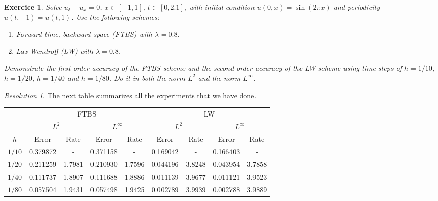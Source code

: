 \documentclass[10pt,a4paper]{article}
\newtheorem{exercici}{Exercice}
\theoremstyle{definition}
\theoremstyle{remark}
\newtheorem*{res}{Resolution}
\begin{document}
\setcounter{exercici}{14}
\begin{exercici}
  Solve $u_t+u_x=0$, $x\in[-1,1]$, $t\in[0,2.1]$, with initial condition $u(0,x)=\sin(2\pi x)$ and periodicity $u(t,-1)=u(t,1)$. Use the following schemes:
  \begin{enumerate}
    \item Forward-time, backward-space (FTBS) with $\lambda =0.8$.
    \item Lax-Wendroff (LW) with $\lambda =0.8$.
  \end{enumerate}
  Demonstrate the first-order accuracy of the FTBS scheme and the second-order accuracy of the LW scheme using time steps of $h=1/10$, $h=1/20$, $h=1/40$ and $h=1/80$. Do it in both the norm $L^2$ and the norm $L^\infty$.
\end{exercici}
\begin{res}
  The next table summarizes all the experiments that we have done.
  \begin{table}[ht]
    \centering
    \begin{tabular}{|c|c|c|c|c||c|c|c|c|}
      \hline
             & \multicolumn{4}{c||}{FTBS} & \multicolumn{4}{c|}{LW}                                                                                                                 \\
      \cline{2-9}
             & \multicolumn{2}{c|}{$L^2$} & \multicolumn{2}{c||}{$L^\infty$} & \multicolumn{2}{c|}{$L^2$} & \multicolumn{2}{c|}{$L^\infty$}                                         \\
      \cline{2-9}
      $h$    & Error                      & Rate                             & Error                      & Rate                            & Error    & Rate   & Error    & Rate   \\
      \hline\hline
      $1/10$ & 0.379872                   & -                                & 0.371158                   & -                               & 0.169042 & -      & 0.166403 & -      \\
      $1/20$ & 0.211259                   & 1.7981                           & 0.210930                   & 1.7596                          & 0.044196 & 3.8248 & 0.043954 & 3.7858 \\
      $1/40$ & 0.111737                   & 1.8907                           & 0.111688                   & 1.8886                          & 0.011139 & 3.9677 & 0.011121 & 3.9523 \\
      $1/80$ & 0.057504                   & 1.9431                           & 0.057498                   & 1.9425                          & 0.002789 & 3.9939 & 0.002788 & 3.9889 \\

\end{tabular}
\end{table}
\end{res}
\end{document}
